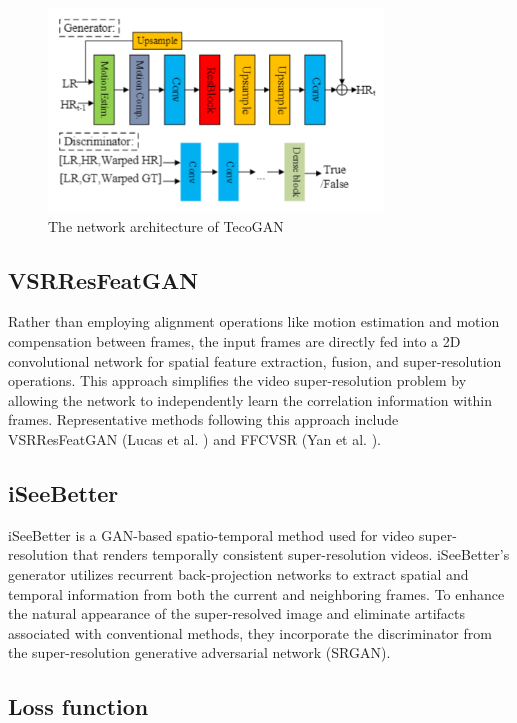 \documentclass[conference]{IEEEtran}
\begin{document}
\begin{figure}[htb]
    \centering
    \centerline{\includegraphics[width=8.9cm]{tecogan}}
    \caption{The network architecture of TecoGAN \cite{video_super_resolution_survey_2020}}
    \label{fig:tecogan}
\end{figure}

\subsection{VSRResFeatGAN}

Rather than employing alignment operations like motion estimation and motion compensation between frames, the input frames are directly fed into a 2D convolutional network for spatial feature extraction, fusion, and super-resolution operations. This approach simplifies the video super-resolution problem by allowing the network to independently learn the correlation information within frames. Representative methods following this approach include VSRResFeatGAN (Lucas et al. \cite{GANs_perc_loss_vsr_2018}) and FFCVSR (Yan et al. \cite{Yan_frame_vsr_2019}).

\subsection{iSeeBetter}

iSeeBetter \cite{iSeeBetter_2020} is a GAN-based spatio-temporal method used for video super-resolution that renders temporally consistent super-resolution videos. iSeeBetter's generator utilizes recurrent back-projection networks to extract spatial and temporal information from both the current and neighboring frames. To enhance the natural appearance of the super-resolved image and eliminate artifacts associated with conventional methods, they incorporate the discriminator from the super-resolution generative adversarial network (SRGAN).

\subsection{Loss function\label{sec:loss_function}}
\end{document}
